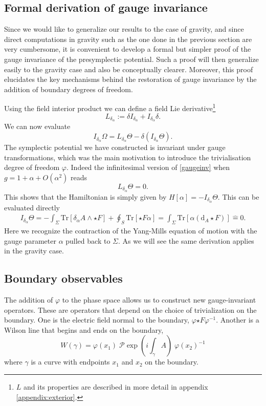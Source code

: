 \documentclass[a4paper,11pt]{article}
\newcommand{\be}{\begin{equation}}
\newcommand{\ee}{\end{equation}}
\newcommand{\bea}{\begin{eqnarray}}
\newcommand{\eea}{\end{eqnarray}}
\def\rd{\mathrm{d}}
\newcommand{\hateq}{\mathrel{\hat{=}}}
\newcommand{\Tr}{\mbox{Tr}}
\begin{document}
\subsection{Formal derivation of gauge invariance}\label{formalgauge}

Since we would like to generalize our results to the case of gravity, and since direct computations in gravity such as the one done in the previous section are very cumbersome, it is convenient to develop a formal but simpler proof of the gauge invariance of the presymplectic potential. 
Such a proof will then generalize easily to the gravity case and also be conceptually clearer. 
Moreover, this proof elucidates the key mechanisms behind the restoration of gauge invariance by the addition of boundary degrees of freedom.

Using the field interior product we can define a field Lie derivative\footnote{$L$ and its properties are described in more detail in appendix \ref{appendix:exterior}.}
\be
L_{\delta_\alpha} := \delta I_{\delta_\alpha} + I_{\delta_\alpha}\delta .
\ee
We can now evaluate
\be
I_{\delta_\alpha} \Omega = L_{\delta_\alpha} \Theta - \delta(I_{\delta_\alpha}\Theta).
\ee
The symplectic potential we have constructed is invariant under gauge transformations, which was the main motivation to introduce the trivialisation degree of freedom $\varphi$. 
Indeed the infinitesimal version of \eqref{gaugeinv} when $g = 1 + \alpha + O(\alpha^2)$ reads 
\be
L_{\delta_\alpha}\Theta=0.
\ee
This shows that the  Hamiltonian is simply given by 
 $H[\alpha]=-I_{\delta_\alpha}\Theta$. 
 This can be evaluated directly
 \bea
 I_{\delta_\alpha}\Theta = -\int_\Sigma \Tr[ \delta_\alpha A \wedge \star F ] + \oint_S \Tr[\star F \alpha] 
 = \int_\Sigma \Tr[\alpha  (\rd_A \star F) ] \hateq 0.
 \eea
Here we recognize the contraction of the Yang-Mills equation of motion with the gauge parameter $\alpha$ pulled back to $\Sigma$.
 As we will see the same derivation applies in the gravity case.

\subsection{Boundary observables }

The addition of $\varphi$ to the phase space allows us to construct new gauge-invariant operators. 
These are operators that depend on the choice of trivialization on the boundary.
One is the electric field normal to the boundary, $ \varphi {\star F} \varphi^{-1}$.
Another is a Wilson line that begins and ends on the boundary,
\begin{equation}
W(\gamma) = \varphi(x_1) \; \mathcal{P} \exp \left(i \int_\gamma A \right) \; \varphi(x_2)^{-1}
\end{equation}
where $\gamma$ is a curve with endpoints $x_1$ and $x_2$ on the boundary.
\end{document}
